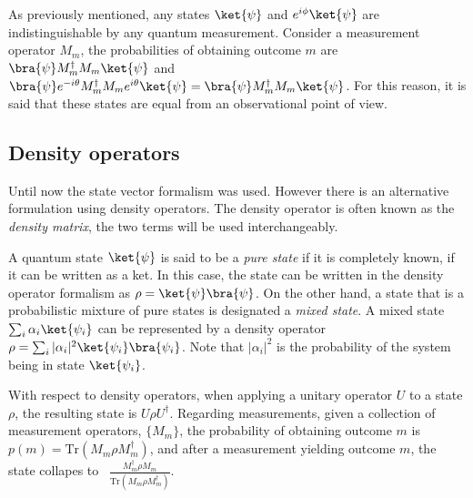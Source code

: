 As previously mentioned, any states $\ket{\psi}$ and $e^{i\phi}\ket{\psi}$ are indistinguishable by any quantum measurement. Consider a measurement operator $M_m$, the probabilities of obtaining outcome $m$ are $\bra{\psi} M_{m}^{\dagger}M_{m}\ket{\psi}$ and $\bra{\psi} e^{-i \theta} M_{m}^{\dagger}M_{m}e^{i\theta}\ket{\psi}=\bra{\psi} M_{m}^{\dagger}M_{m}\ket{\psi}$. For this reason, it is said that these states are equal from an observational point of view.




\subsection{Density operators}
Until now the state vector formalism was used. However there is an alternative formulation using density operators. The density operator is often known as the \emph{density matrix}, the two terms will be used interchangeably.



A quantum state $\ket{\psi}$ is said to be a \emph{pure state} if it is completely known,  if it can be written as a ket. In this case, the state can be written in the density operator formalism as $\rho = \ket{\psi}\bra{\psi}$. On the other hand, a state that is a probabilistic mixture of pure states is designated a \emph{mixed state}. A mixed state $\sum_i \alpha_i \ket{\psi_i}$ can be represented by a density operator $\rho= \sum_i |\alpha_i|^{2}\ket{\psi_i}\bra{\psi_i}$. Note that $|\alpha_i|^{2}$ is the probability of the system being in state $\ket{\psi_i}$. 

With respect to density operators, when applying a unitary operator $U$ to a state $\rho$, the resulting state is $U\rho U^{\dag}$. Regarding measurements, given a collection of measurement operators, $\{M_{m}\}$, the probability of obtaining outcome $m$ is $p(m)=\text{Tr}(M_{m}\rho M_{m}^{\dag})$, and after a measurement yielding outcome $m$, the state collapes to  $\frac{M_{m}^{\dag}\rho M_{m}}{\text{Tr}(M_{m}\rho M_{m}^{\dag})}$.

